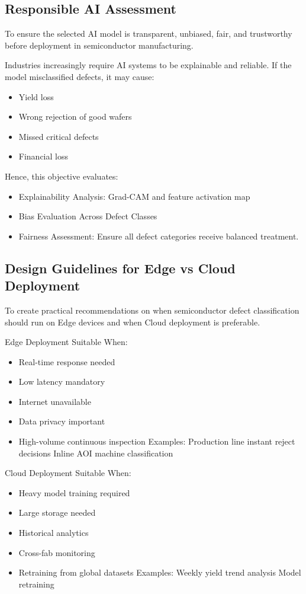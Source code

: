 \subsection {Responsible AI Assessment}

To ensure the selected AI model is transparent, unbiased, fair, and trustworthy before deployment in semiconductor manufacturing.

Industries increasingly require AI systems to be explainable and reliable. If the model misclassified defects, it may cause:
\begin{itemize}
\item Yield loss
\item Wrong rejection of good wafers
\item Missed critical defects
\item Financial loss
\end{itemize}
Hence, this objective evaluates:
\begin{itemize}
\item  Explainability Analysis: Grad-CAM and feature activation map
\item  Bias Evaluation Across Defect Classes
\item  Fairness Assessment: Ensure all defect categories receive balanced treatment.
\end{itemize}

\subsection  {Design Guidelines for Edge vs Cloud Deployment}

To create practical recommendations on when semiconductor defect classification should run on Edge devices and when Cloud deployment is preferable.

Edge Deployment Suitable When:
\begin{itemize}
\item Real-time response needed
\item Low latency mandatory
\item Internet unavailable
\item Data privacy important
\item High-volume continuous inspection \newline
Examples:\newline
Production line instant reject decisions\newline
Inline AOI machine classification \newline
\end{itemize} 
Cloud Deployment Suitable When:
\begin{itemize}
\item  Heavy model training required
\item  Large storage needed
\item  Historical analytics
\item  Cross-fab monitoring
\item  Retraining from global datasets
Examples:\newline
Weekly yield trend analysis\newline
Model retraining \newline
\end{itemize}